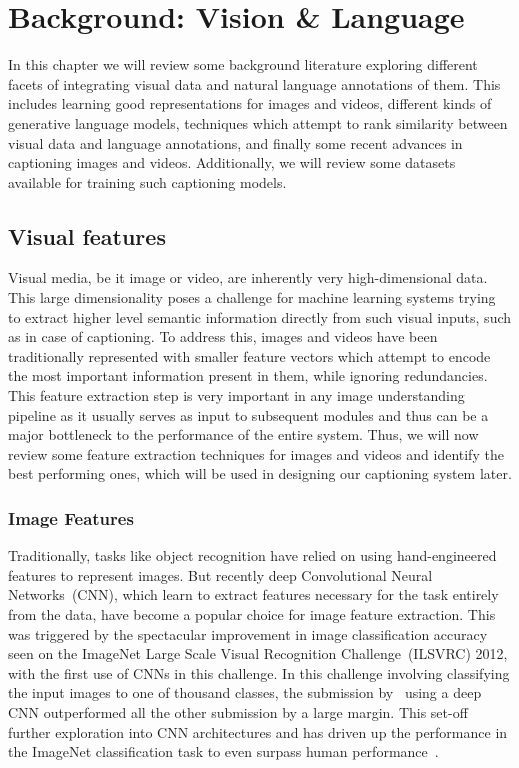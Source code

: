 \chapter{Background: Vision \& Language} \label{chapter:background} 
In this chapter we will review some background literature exploring different
facets of integrating visual data and natural language annotations of them.
This includes learning good representations for images and videos, different
kinds of generative language models, techniques which attempt to rank similarity
between visual data and language annotations, and finally some recent advances
in captioning images and videos.
Additionally, we will review some datasets available for training such captioning
models.

\section{Visual features}
Visual media, be it image or video, are inherently very high-dimensional data.
This large dimensionality poses a challenge for machine learning systems trying
to extract higher level semantic information directly from such visual inputs,
such as in case of captioning.
To address this, images and videos have been traditionally represented with
smaller feature vectors which attempt to encode the most important information
present in them, while ignoring redundancies. 
This feature extraction step is very important in any image understanding
pipeline as it usually serves as input to subsequent modules and thus can be a
major bottleneck to the performance of the entire system.
Thus, we will now review some feature extraction techniques for images and
videos and identify the best performing ones, which will be used in
designing our captioning system later.

\subsection{Image Features}
Traditionally, tasks like object recognition have relied on using
hand-engineered features to represent images. 
But recently deep Convolutional Neural Networks~(CNN), which learn to extract
features necessary for the task entirely from the data, have become a popular
choice for image feature extraction.
This was triggered by the spectacular improvement in image classification
accuracy seen on the ImageNet Large Scale Visual Recognition Challenge~(ILSVRC)
2012, with the first use of CNNs in this challenge.
In this challenge involving classifying the input images to one of thousand
classes, the submission by~\cite{Krizhevsky2012} using a deep CNN outperformed
all the other submission by a large margin.
This set-off further exploration into CNN architectures and has driven up the
performance in the ImageNet classification task to even surpass human
performance~\cite{he2015delving}.

